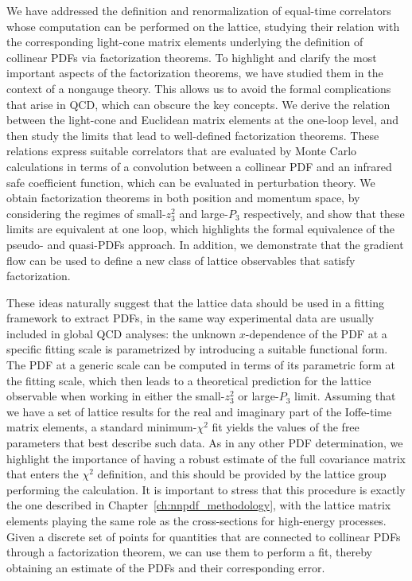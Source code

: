 We have addressed the definition and renormalization of equal-time
correlators whose computation can be performed on the lattice, studying their
relation with the corresponding light-cone matrix elements underlying the
definition of collinear PDFs via factorization theorems.
%
To highlight and clarify the most important aspects of the factorization
theorems, we have studied them in the context of a nongauge theory. This allows
us to avoid the formal complications that arise in QCD, which can obscure the key concepts. 
%
We derive the relation between the light-cone and Euclidean matrix
elements at the one-loop level, and then study the limits that lead to well-defined
factorization theorems. These relations express suitable correlators that are evaluated by
Monte Carlo calculations in terms of a convolution between a collinear PDF and an
infrared safe coefficient function, which can be evaluated in perturbation
theory. We obtain factorization theorems in both position and momentum
space, by considering the regimes of small-$z_3^2$ and large-$P_3$ respectively, and
show that these limits are equivalent at one loop, which highlights the formal
equivalence of the pseudo- and quasi-PDFs approach. In addition, we demonstrate that
 the gradient flow can be used to define a new class of lattice observables that satisfy factorization.

These ideas naturally suggest that the lattice data should be used in a fitting framework to extract
PDFs, in the same way experimental data are usually included in global QCD
analyses:
the unknown $x$-dependence of the PDF at a
specific fitting scale is parametrized by introducing a suitable functional
form. The PDF at a generic scale can be computed in terms of its parametric form
at the fitting scale, which then leads to a theoretical prediction for the
lattice observable when working in either the small-$z_3^2$ or large-$P_3$
limit. Assuming that we have a set of lattice results for the real and imaginary
part of the Ioffe-time matrix elements, a standard minimum-$\chi^2$ fit yields
the values of the free parameters that best describe such data. As in any other
PDF determination, we highlight the importance of having a robust estimate of
the full covariance matrix that enters the $\chi^2$ definition, and this should
be provided by the lattice group performing the calculation.
It is important to stress that this procedure is exactly the one
described in Chapter~\ref{ch:nnpdf_methodology}, with the lattice matrix
elements playing the same role as the cross-sections for high-energy processes.
Given a discrete set of points for quantities that are connected to collinear
PDFs through a factorization theorem, we can use them to perform a fit, thereby
obtaining an estimate of the PDFs and their corresponding error.
  
